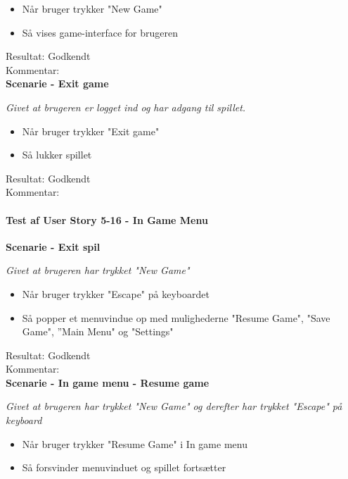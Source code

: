 \begin{itemize}
  \item Når bruger trykker "New Game"
  \item Så vises game-interface for brugeren
\end{itemize}

Resultat: Godkendt\\
Kommentar:\\

\textbf{Scenarie - Exit game}

\textit{Givet at brugeren er logget ind og har adgang til spillet.}

\begin{itemize}
  \item Når bruger trykker "Exit game"
  \item Så lukker spillet
\end{itemize}

Resultat: Godkendt\\
Kommentar:\\

\paragraph{Test af User Story 5-16 - In Game Menu}

\textbf{Scenarie - Exit spil}

\textit{Givet at brugeren har trykket "New Game"}

\begin{itemize}
  \item Når bruger trykker "Escape" på keyboardet
  \item Så popper et menuvindue op med mulighederne "Resume Game", "Save Game", ”Main Menu" og "Settings"
\end{itemize}

Resultat: Godkendt\\
Kommentar:\\

\textbf{Scenarie - In game menu - Resume game}

\textit{Givet at brugeren har trykket "New Game" og derefter har trykket "Escape" på keyboard}

\begin{itemize}
  \item Når bruger trykker "Resume Game" i In game menu
  \item Så forsvinder menuvinduet og spillet fortsætter
\end{itemize}

